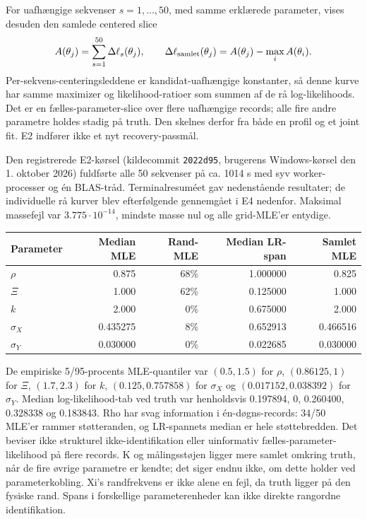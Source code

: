For uafhængige sekvenser \(s=1,\ldots,50\), med samme erklærede parameter,
vises desuden den samlede centered slice
\[
 A(\theta_j)=\sum_{s=1}^{50}\Delta\ell_s(\theta_j),\qquad
 \Delta\ell_{\rm samlet}(\theta_j)=A(\theta_j)-\max_i A(\theta_i).
\]
Per-sekvens-centeringsleddene er kandidat-uafhængige konstanter, så denne kurve
har samme maximizer og likelihood-ratioer som summen af de rå log-likelihoods.
Det er en fælles-parameter-slice over flere uafhængige records; alle fire andre
parametre holdes stadig på truth. Den skelnes derfor fra både en profil og et
joint fit. E2 indfører ikke et nyt recovery-passmål.

Den registrerede E2-kørsel (kildecommit \texttt{2022d95}, brugerens Windows-kørsel
den 1. oktober 2026) fuldførte alle 50 sekvenser på ca. 1014 s med syv
worker-processer og én BLAS-tråd. Terminalresuméet gav nedenstående resultater;
de individuelle rå kurver blev efterfølgende gennemgået i E4 nedenfor.
Maksimal massefejl var \(3.775\cdot10^{-14}\), mindste masse nul og alle
grid-MLE'er entydige.
\begin{center}
\small
\begin{tabular}{lrrrr}
\toprule
Parameter & Median MLE & Rand-MLE & Median LR-span & Samlet MLE \\
\midrule
\(\rho\)     & 0.875    & 68\% & 1.000000 & 0.825 \\
\(\Xi\)      & 1.000    & 62\% & 0.125000 & 1.000 \\
\(k\)        & 2.000    & 0\%  & 0.675000 & 2.000 \\
\(\sigma_X\) & 0.435275 & 8\%  & 0.652913 & 0.466516 \\
\(\sigma_Y\) & 0.030000 & 0\%  & 0.022685 & 0.030000 \\
\bottomrule
\end{tabular}
\end{center}
De empiriske 5/95-procents MLE-quantiler var \((0.5,1.5)\) for \(\rho\),
\((0.86125,1)\) for \(\Xi\), \((1.7,2.3)\) for \(k\),
\((0.125,0.757858)\) for \(\sigma_X\) og \((0.017152,0.038392)\) for
\(\sigma_Y\). Median log-likelihood-tab ved truth var henholdsvis
0.197894, 0, 0.260400, 0.328338 og 0.183843.
Rho har svag information i én-døgns-records: 34/50 MLE'er rammer støtteranden,
og LR-spannets median er hele støttebredden. Det beviser ikke strukturel
ikke-identifikation eller uinformativ fælles-parameter-likelihood på flere records.
K og målingsstøjen ligger mere samlet omkring truth, når de fire øvrige parametre
er kendte; det siger endnu ikke, om dette holder ved parameterkobling.
Xi's randfrekvens er ikke alene en fejl, da truth ligger på den fysiske rand.
Spans i forskellige parameterenheder kan ikke direkte rangordne identifikation.

